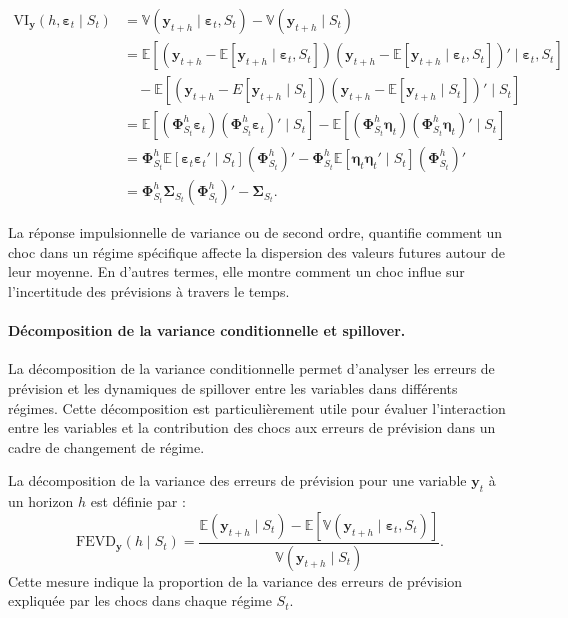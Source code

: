 \begin{sloppypar}
\begin{equation}
\begin{split}
\text{VI}_{\bm{y}}(h, \bm{\varepsilon}_t \mid S_t) &=  \mathbb{V}(\bm{y}_{t+h} \mid \bm{\varepsilon}_t, S_t) -  \mathbb{V}(\bm{y}_{t+h} \mid S_t) \\
&= \mathbb{E}\left[(\bm{y}_{t+h} - \mathbb{E}[\bm{y}_{t+h} \mid \bm{\varepsilon}_t, S_t])(\bm{y}_{t+h} -  \mathbb{E}[\bm{y}_{t+h} \mid \bm{\varepsilon}_t, S_t])' \mid \bm{\varepsilon}_t, S_t \right] \\
&\quad -  \mathbb{E}\left[(\bm{y}_{t+h} - E[\bm{y}_{t+h} \mid S_t])(\bm{y}_{t+h} -  \mathbb{E}[\bm{y}_{t+h} \mid S_t])' \mid S_t \right] \\
&=  \mathbb{E}\left[(\bm{\Phi}_{S_t}^h \bm{\varepsilon}_t)(\bm{\Phi}_{S_t}^h \bm{\varepsilon}_t)' \mid S_t \right] -  \mathbb{E}\left[(\bm{\Phi}_{S_t}^h \bm{\eta}_t)(\bm{\Phi}_{S_t}^h \bm{\eta}_t)' \mid S_t \right] \\
&= \bm{\Phi}_{S_t}^h  \mathbb{E}\left[\bm{\varepsilon}_t \bm{\varepsilon}_t' \mid S_t\right] (\bm{\Phi}_{S_t}^h)' - \bm{\Phi}_{S_t}^h \mathbb{E}\left[\bm{\eta}_t \bm{\eta}_t' \mid S_t\right] (\bm{\Phi}_{S_t}^h)' \\
&= \bm{\Phi}_{S_t}^h \bm{\Sigma}_{S_t} (\bm{\Phi}_{S_t}^h)' - \bm{\Sigma}_{S_t}.
\end{split}
\end{equation}

La réponse impulsionnelle de variance ou de second ordre, quantifie comment un choc dans un régime spécifique affecte la dispersion des valeurs futures autour de leur moyenne. En d’autres termes, elle montre comment un choc influe sur l’incertitude des prévisions à travers le temps. 

\paragraph{Décomposition de la variance conditionnelle et spillover.} La décomposition de la variance conditionnelle permet d’analyser les erreurs de prévision et les dynamiques de spillover entre les variables dans différents régimes. Cette décomposition est particulièrement utile pour évaluer l'interaction entre les variables et la contribution des chocs aux erreurs de prévision dans un cadre de changement de régime.

La décomposition de la variance des erreurs de prévision pour une variable \( \bm{y}_t \) à un horizon \( h \) est définie par :
\[
\text{FEVD}_{\bm{y}}(h \mid S_t) = \frac{\mathbb{E}(\bm{y}_{t+h} \mid S_t) -  \mathbb{E}[ \mathbb{V}(\bm{y}_{t+h} \mid \bm{\varepsilon}_t, S_t)]}{ \mathbb{V}(\bm{y}_{t+h} \mid S_t)}.
\]
Cette mesure indique la proportion de la variance des erreurs de prévision expliquée par les chocs dans chaque régime \( S_t \). 


\end{sloppypar}
